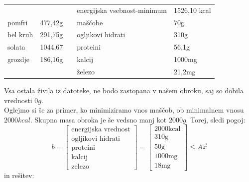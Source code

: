 \documentclass[slovene,11pt,a4paper]{article}
\numberwithin{equation}{section} %
\numberwithin{figure}{section} %
\numberwithin{table}{section} %
\begin{document}
\begin{table}[h]
\centering
\label{my-label}
\begin{tabular}{lll|l|l|}
\cline{4-5}
                               &                              &  & energijska vsebnost-minimum & 1526,10 kcal \\ \cline{1-2} \cline{4-5} 
\multicolumn{1}{|l|}{pomfri}   & \multicolumn{1}{l|}{477,42g} &  & maščobe                     & 70g     \\ \cline{1-2} \cline{4-5} 
\multicolumn{1}{|l|}{bel kruh} & \multicolumn{1}{l|}{291,75g} &  & ogljikovi hidrati           & 310g    \\ \cline{1-2} \cline{4-5} 
\multicolumn{1}{|l|}{solata}   & \multicolumn{1}{l|}{1044,67} &  & proteini                    & 56,1g   \\ \cline{1-2} \cline{4-5} 
\multicolumn{1}{|l|}{grozdje}  & \multicolumn{1}{l|}{186,16g} &  & kalcij                      & 1000mg  \\ \cline{1-2} \cline{4-5} 
                               &                              &  & železo                      & 21,2mg  \\ \cline{4-5} 
\end{tabular}
\end{table}
Vsa ostala živila iz datoteke, ne bodo zastopana v našem obroku, saj so dobila vrednosti $0g$.\\
Oglejmo si še za primer, ko minimiziramo vnos maščob, ob minimalnem vnosu $2000kcal$. Skupna masa obroka je še vedsno manj kot $2000g$. Torej, sledi pogoj:
\begin{equation}
\label{eq-vec-od-1}
    b =
    \begin{bmatrix}
        \text{energijska vrednost} \\
        \text{ogljikovi hidrati} \\
        \text{proteini} \\
        \text{kalcij} \\
        \text{zelezo}
    \end{bmatrix}
    =
        \begin{bmatrix}
        \text{2000kcal} \\
        \text{310g} \\
        \text{50g} \\
        \text{1000mg} \\
        \text{18mg}
    \end{bmatrix}
    \leq
    A \vec{x}
\end{equation}
in rešitev:
\end{document}
